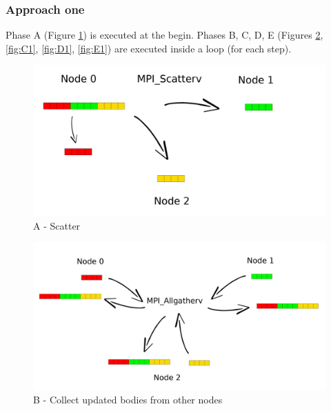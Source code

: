 \documentclass[a4paper]{article}
\begin{document}
\subsubsection{Approach one}
\label{sec:app_1}
Phase A (Figure \ref{fig:A1}) is executed at the begin. Phases B, C, D, E (Figures \ref{fig:B1}, \ref{fig:C1}, \ref{fig:D1}, \ref{fig:E1}) are executed inside a loop (for each step).

\begin{figure}[ht]
  \centering
  \includegraphics[width=0.6\linewidth]{scatter}
  \caption{A - Scatter}
  \label{fig:A1}
\end{figure}
\FloatBarrier

\begin{figure}[ht]
  \centering
  \includegraphics[width=0.6\linewidth]{MPI_all_gather}
  \caption{B - Collect updated bodies from other nodes}
  \label{fig:B1}
\end{figure}
\FloatBarrier
\end{document}
